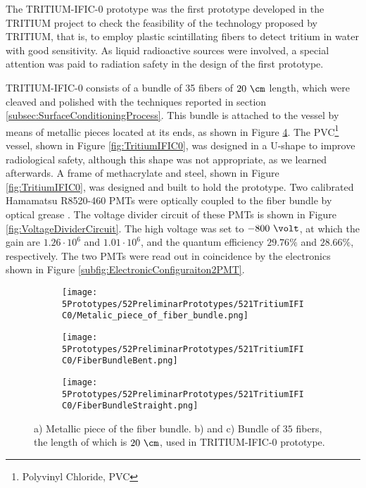 The TRITIUM-IFIC-0 prototype was the first prototype developed in the TRITIUM project to check the feasibility of the technology proposed by TRITIUM, that is, to employ plastic scintillating fibers to detect tritium in water with good sensitivity. As liquid radioactive sources were involved, a special attention was paid to radiation safety in the design of the first prototype.

TRITIUM-IFIC-0 consists of a bundle of 35 fibers of $20~\cm$ length, which were cleaved and polished with the techniques reported in section \ref{subsec:SurfaceConditioningProcess}. This bundle is attached to the vessel by means of metallic pieces located at its ends, as shown in Figure \ref{fig:FiberBundleOfTritiumIFIC0}. The PVC\footnote{Polyvinyl Chloride, PVC} vessel, shown in Figure \ref{fig:TritiumIFIC0}, was designed in a U-shape to improve radiological safety, although this shape was not appropriate, as we learned afterwards. A frame of methacrylate and steel, shown in Figure \ref{fig:TritiumIFIC0}, was designed and built to hold the prototype. Two calibrated Hamamatsu R8520-460 PMTs \cite{DataSheetPMTs} were optically coupled to the fiber bundle by optical grease \cite{OpticalGrease}. The voltage divider circuit of these PMTs is shown in Figure  \ref{fig:VoltageDividerCircuit}. The high voltage was set to $-800~\volt$, at which the gain are $1.26 \cdot{} 10^6$ and $1.01 \cdot{} 10^6$, and the quantum efficiency $29.76\%$ and $28.66\%$, respectively. The two PMTs were read out in coincidence by the electronics shown in Figure \ref{subfig:ElectronicConfiguraiton2PMT}.

\begin{figure}
\centering
    \begin{subfigure}[b]{0.5\textwidth}
    \centering
    \texttt{[image: 5Prototypes/52PreliminarPrototypes/521TritiumIFIC0/Metalic\_piece\_of\_fiber\_bundle.png]}  
    \caption{\label{subfig:MetalicPieceFiberBunchTritiumIFIC0}}
    \end{subfigure}
    \hfill
    \begin{subfigure}[b]{0.4\textwidth}
    \centering
    \texttt{[image: 5Prototypes/52PreliminarPrototypes/521TritiumIFIC0/FiberBundleBent.png]}  
    \caption{\label{subfig:FiberBunchTritiumIFIC0Bent}}
    \end{subfigure}
    \hfill
    \begin{subfigure}[b]{0.7\textwidth}
    \centering
    \texttt{[image: 5Prototypes/52PreliminarPrototypes/521TritiumIFIC0/FiberBundleStraight.png]}  
    \caption{\label{subfig:FiberBunchTritiumIFIC0}}
    \end{subfigure}
 \caption{a) Metallic piece of the fiber bundle. b) and c) Bundle of $35$ fibers, the length of which is $20~\cm$, used in TRITIUM-IFIC-0 prototype.} \label{fig:FiberBundleOfTritiumIFIC0}
\end{figure}

